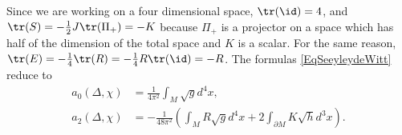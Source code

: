 Since we are working on a four dimensional space, $\tr(\id)=4$, and $\tr(S)=-\frac{ 1 }{2}J\tr(\Pi_+)=-K$ because $\Pi_+$ is a projector on a space which has half of the dimension of the total space and $K$ is a scalar. For the same reason, $\tr(E)=-\frac{ 1 }{ 4 }\tr(R)=-\frac{ 1 }{ 4 }R\tr(\id)=-R$. The formulas \eqref{EqSeeyleydeWitt} reduce to
\begin{subequations}
\begin{align}
a_0(\Delta,\chi)	&=\frac{1}{ 4\pi^2 }\int_M\sqrt{g}d^4x,\\
a_2(\Delta,\chi)	&=-\frac{1}{ 48\pi^2 }\left( \int_M R\sqrt{g}d^4x + 2\int_{\partial M}K\sqrt{h}d^3x \right).
\end{align}
\end{subequations}


